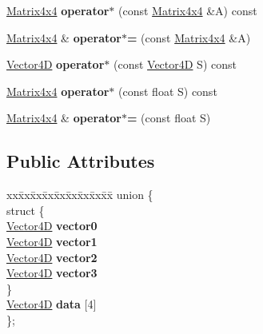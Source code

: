 \begin{DoxyCompactItemize}
\hyperlink{classdrider_s_d_k_1_1_matrix4x4}{Matrix4x4} {\bfseries operator$\ast$} (const \hyperlink{classdrider_s_d_k_1_1_matrix4x4}{Matrix4x4} \&A) const
\item 
\mbox{\label{classdrider_s_d_k_1_1_matrix4x4_acd67cbc0ab9d008cb74ff0051f5367cf}} 
\hyperlink{classdrider_s_d_k_1_1_matrix4x4}{Matrix4x4} \& {\bfseries operator$\ast$=} (const \hyperlink{classdrider_s_d_k_1_1_matrix4x4}{Matrix4x4} \&A)
\item 
\mbox{\label{classdrider_s_d_k_1_1_matrix4x4_a33fa4a071b036e39a1a9b29dd2d002ca}} 
\hyperlink{classdrider_s_d_k_1_1_vector4_d}{Vector4D} {\bfseries operator$\ast$} (const \hyperlink{classdrider_s_d_k_1_1_vector4_d}{Vector4D} S) const
\item 
\mbox{\label{classdrider_s_d_k_1_1_matrix4x4_a5917fdd91bad190195d6aa12a12449f3}} 
\hyperlink{classdrider_s_d_k_1_1_matrix4x4}{Matrix4x4} {\bfseries operator$\ast$} (const float S) const
\item 
\mbox{\label{classdrider_s_d_k_1_1_matrix4x4_a9e176d8b8f0e31acb586d20c3765bf39}} 
\hyperlink{classdrider_s_d_k_1_1_matrix4x4}{Matrix4x4} \& {\bfseries operator$\ast$=} (const float S)
\end{DoxyCompactItemize}
\subsection*{Public Attributes}
\begin{DoxyCompactItemize}
\item 
\mbox{\label{classdrider_s_d_k_1_1_matrix4x4_a0d36123916276477e42d6ee3670ef6c2}} 
\begin{tabbing}
xx\=xx\=xx\=xx\=xx\=xx\=xx\=xx\=xx\=\kill
union \{\\
\mbox{\label{uniondrider_s_d_k_1_1_matrix4x4_1_1_0D4_a6b296e2bc65a1ac7de424acd7c798614}} 
\>struct \{\\
\>\>\hyperlink{classdrider_s_d_k_1_1_vector4_d}{Vector4D} {\bfseries vector0}\\
\>\>\hyperlink{classdrider_s_d_k_1_1_vector4_d}{Vector4D} {\bfseries vector1}\\
\>\>\hyperlink{classdrider_s_d_k_1_1_vector4_d}{Vector4D} {\bfseries vector2}\\
\>\>\hyperlink{classdrider_s_d_k_1_1_vector4_d}{Vector4D} {\bfseries vector3}\\
\>\} \\
\>\hyperlink{classdrider_s_d_k_1_1_vector4_d}{Vector4D} {\bfseries data} \mbox{[}4\mbox{]}\\
\}; \\

\end{tabbing}\end{DoxyCompactItemize}


